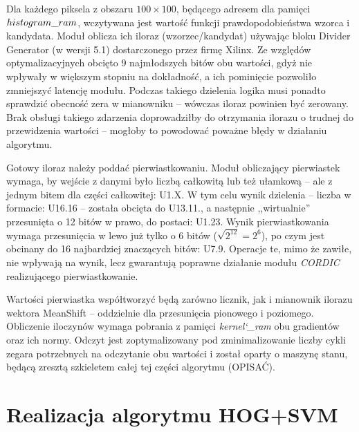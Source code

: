 Dla każdego piksela z obszaru $100 \times 100$, będącego adresem dla pamięci $histogram\char`_ram$, wczytywana jest wartość funkcji prawdopodobieństwa wzorca i kandydata. 
Moduł oblicza ich iloraz (wzorzec/kandydat) używając bloku Divider Generator (w wersji 5.1) dostarczonego przez firmę Xilinx. %
Ze względów optymalizacyjnych obcięto 9 najmłodszych bitów obu wartości, gdyż nie wpływały w większym stopniu na dokładność, a ich pominięcie pozwoliło zmniejszyć latencję modułu. %
Podczas takiego dzielenia logika musi ponadto sprawdzić obecność zera w mianowniku -- wówczas iloraz powinien być zerowany. 
Brak obsługi takiego zdarzenia doprowadziłby do otrzymania ilorazu o trudnej do przewidzenia wartości -- mogłoby to powodować poważne błędy w działaniu algorytmu. 

Gotowy iloraz należy poddać pierwiastkowaniu. 
Moduł obliczający pierwiastek wymaga, by wejście z danymi było liczbą całkowitą lub  też ułamkową -- ale z jednym bitem dla części całkowitej: U1.X. 
W tym celu wynik dzielenia -- liczba w formacie: U16.16 -- została obcięta do U13.11., a następnie ,,wirtualnie'' przesunięta o 12 bitów w prawo, do postaci: U1.23. 
Wynik pierwiastkowania wymaga przesunięcia w lewo już tylko o 6 bitów ($\sqrt{2^{12}}=2^6$), po czym jest obcinany do 16 najbardziej znaczących bitów: U7.9.
Operacje te, mimo że zawiłe, nie wpływają na wynik, lecz gwarantują poprawne działanie modułu \textit{CORDIC} realizującego pierwiastkowanie.

Wartości pierwiastka współtworzyć będą zarówno licznik, jak i mianownik ilorazu wektora MeanShift -- oddzielnie dla przesunięcia pionowego i poziomego. %
Obliczenie iloczynów wymaga pobrania z pamięci \textit{kernel\char`_ram} obu gradientów oraz ich normy. 
Odczyt jest zoptymalizowany pod zminimalizowanie liczby cykli zegara potrzebnych na odczytanie obu wartości i został oparty o maszynę stanu, będącą zresztą szkieletem całej tej części algorytmu (OPISAĆ). %




\section{Realizacja algorytmu HOG+SVM}


